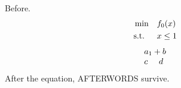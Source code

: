 \documentclass{article}
\begin{document}
Before.
\begin{equation}
\begin{aligned}
&\min &\multicolumn{2}{l}{$f_0(x)$}\\
&\text{s.t.} & x &\leq 1
\end{aligned}
\end{equation}
\[ \begin{array}{cc} \multicolumn{2}{c}{a_1+b} \\ c & d \end{array} \]
After the equation, AFTERWORDS survive.
\end{document}
